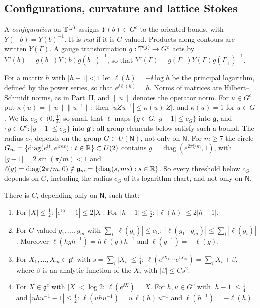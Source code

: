 \subsection{Configurations, curvature and lattice Stokes}\label{ss:21.2}

A \emph{configuration} on $\mathbb T^{(j)}$ assigns $Y(b)\in G^c$ to the oriented bonds, with $Y(-b)=Y(b)^{-1}$. It is \emph{real} if it is $G$-valued. Products along contours are written $Y(\Gamma)$. A gauge transformation $g:\mathbb T^{(j)}\to G^c$ acts by $Y^g(b)=g(b_-)Y(b)g(b_+)^{-1}$, so that $Y^g(\Gamma)=g(\Gamma_-)Y(\Gamma)g(\Gamma_+)^{-1}$.

For a matrix $h$ with $|h-1|<1$ let $\ell(h)=-\ii\log h$ be the principal logarithm, defined by the power series, so that $e^{\ii\ell(h)}=h$. Norms of matrices are Hilbert--Schmidt norms, as in Part~II, and $\|u\|$ denotes the operator norm. For $u\in G^c$ put $\kappa(u)=\|u\|\|u^{-1}\|$; then $|uZu^{-1}|\le\kappa(u)|Z|$, and $\kappa(u)=1$ for $u\in G$. We fix $c_G\in(0,\frac14]$ so small that $\ell$ maps $\{g\in G:|g-1|\le c_G\}$ into $\mathfrak g$, and $\{g\in G^c:|g-1|\le c_G\}$ into $\mathfrak g^c$; all group elements below satisfy such a bound. The radius $c_G$ depends on the group $G\subset U(\mathsf N)$, not only on $\mathsf N$. For $m\ge7$ the circle $G_m=\{\operatorname{diag}(e^{\mathrm i t},e^{\mathrm i mt}):t\in\mathbb R\}\subset U(2)$ contains $g=\operatorname{diag}(e^{2\pi\ii/m},1)$, with $|g-1|=2\sin(\pi/m)<1$ and $\ell(g)=\operatorname{diag}(2\pi/m,0)\notin\mathfrak g_m=\{\operatorname{diag}(s,ms):s\in\mathbb R\}$. So every threshold below $c_G$ depends on $G$, including the radius $c_G$ of its logarithm chart, and not only on $\mathsf N$.

\begin{lemma}\label{lem:log-estimates}
There is $C$, depending only on $\mathsf N$, such that:
\begin{enumerate}[label=(\alph*)]
\item For $|X|\le\frac12$: $|e^{\ii X}-1|\le2|X|$. For $|h-1|\le\frac12$: $|\ell(h)|\le2|h-1|$.
\item For $G$-valued $g_1,\dots,g_m$ with $\sum_i|\ell(g_i)|\le c_G$: $|\ell(g_1\cdots g_m)|\le\sum_i|\ell(g_i)|$. Moreover $\ell(hgh^{-1})=h\ell(g)h^{-1}$ and $\ell(g^{-1})=-\ell(g)$.
\item For $X_1,\dots,X_m\in\mathfrak g^c$ with $s=\sum_i|X_i|\le\frac14$: $\ell(e^{\ii X_1}\cdots e^{\ii X_m})=\sum_iX_i+\beta$, where $\beta$ is an analytic function of the $X_i$ with $|\beta|\le Cs^2$.
\item For $X\in\mathfrak g^c$ with $|X|<\log2$: $\ell(e^{\ii X})=X$. For $h,u\in G^c$ with $|h-1|\le\frac14$ and $|uhu^{-1}-1|\le\frac12$: $\ell(uhu^{-1})=u\,\ell(h)\,u^{-1}$ and $\ell(h^{-1})=-\ell(h)$.
\end{enumerate}
\end{lemma}

